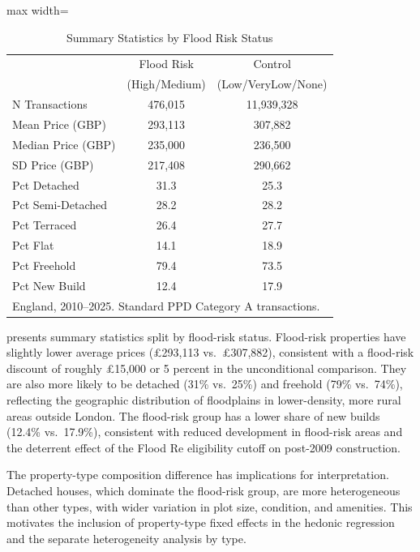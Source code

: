 \documentclass[12pt]{article}
\begin{document}
\begin{table}[htbp]
\centering
\caption{Summary Statistics by Flood Risk Status}
\label{tab:summary}
\begin{adjustbox}{max width=\textwidth}
\begin{tabular}{lcc}
\hline\hline
 & Flood Risk & Control \\
 & (High/Medium) & (Low/VeryLow/None) \\
\hline
N Transactions & 476,015 & 11,939,328 \\
Mean Price (GBP) & 293,113 & 307,882 \\
Median Price (GBP) & 235,000 & 236,500 \\
SD Price (GBP) & 217,408 & 290,662 \\
Pct Detached & 31.3 & 25.3 \\
Pct Semi-Detached & 28.2 & 28.2 \\
Pct Terraced & 26.4 & 27.7 \\
Pct Flat & 14.1 & 18.9 \\
Pct Freehold & 79.4 & 73.5 \\
Pct New Build & 12.4 & 17.9 \\
\hline\hline
\multicolumn{3}{l}{\footnotesize England, 2010--2025. Standard PPD Category A transactions.} \\
\end{tabular}
\end{adjustbox}
\end{table}

 presents summary statistics split by flood-risk status. Flood-risk properties have slightly lower average prices (\pounds293,113 vs.\ \pounds307,882), consistent with a flood-risk discount of roughly \pounds15,000 or 5 percent in the unconditional comparison. They are also more likely to be detached (31\% vs.\ 25\%) and freehold (79\% vs.\ 74\%), reflecting the geographic distribution of floodplains in lower-density, more rural areas outside London. The flood-risk group has a lower share of new builds (12.4\% vs.\ 17.9\%), consistent with reduced development in flood-risk areas and the deterrent effect of the Flood Re eligibility cutoff on post-2009 construction.

The property-type composition difference has implications for interpretation. Detached houses, which dominate the flood-risk group, are more heterogeneous than other types, with wider variation in plot size, condition, and amenities. This motivates the inclusion of property-type fixed effects in the hedonic regression and the separate heterogeneity analysis by type.
\end{document}

